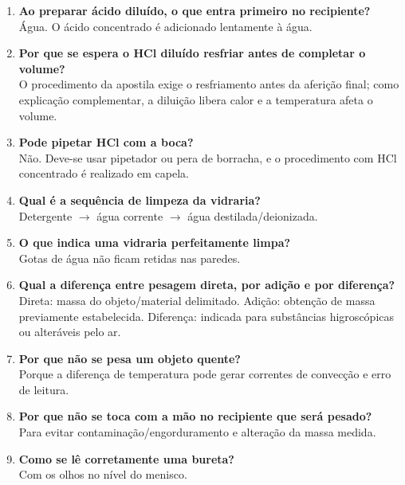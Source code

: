 \documentclass[a4paper,12pt]{article}
\begin{document}
\begin{enumerate}[leftmargin=1.8em]
    \item \textbf{Ao preparar ácido diluído, o que entra primeiro no recipiente?}\\
    Água. O ácido concentrado é adicionado lentamente à água.

    \item \textbf{Por que se espera o HCl diluído resfriar antes de completar o volume?}\\
    O procedimento da apostila exige o resfriamento antes da aferição final; como explicação complementar, a diluição libera calor e a temperatura afeta o volume.

    \item \textbf{Pode pipetar HCl com a boca?}\\
    Não. Deve-se usar pipetador ou pera de borracha, e o procedimento com HCl concentrado é realizado em capela.

    \item \textbf{Qual é a sequência de limpeza da vidraria?}\\
    Detergente $\rightarrow$ água corrente $\rightarrow$ água destilada/deionizada.

    \item \textbf{O que indica uma vidraria perfeitamente limpa?}\\
    Gotas de água não ficam retidas nas paredes.

    \item \textbf{Qual a diferença entre pesagem direta, por adição e por diferença?}\\
    Direta: massa do objeto/material delimitado. Adição: obtenção de massa previamente estabelecida. Diferença: indicada para substâncias higroscópicas ou alteráveis pelo ar.

    \item \textbf{Por que não se pesa um objeto quente?}\\
    Porque a diferença de temperatura pode gerar correntes de convecção e erro de leitura.

    \item \textbf{Por que não se toca com a mão no recipiente que será pesado?}\\
    Para evitar contaminação/engorduramento e alteração da massa medida.

    \item \textbf{Como se lê corretamente uma bureta?}\\
    Com os olhos no nível do menisco.


\end{enumerate}
\end{document}
